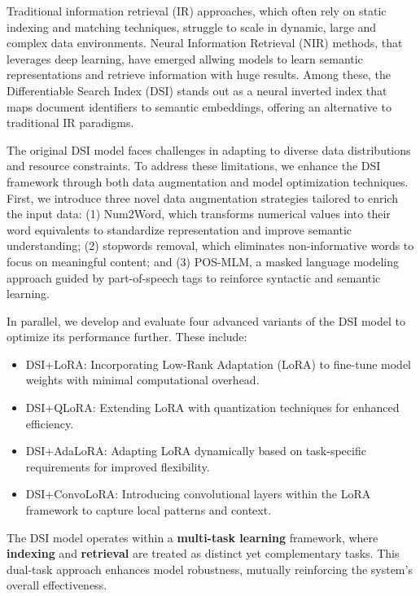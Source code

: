 Traditional information retrieval (IR) approaches, which often rely on static indexing and matching techniques, struggle to scale in dynamic, large and complex data environments. Neural Information Retrieval (NIR) methods, that leverages deep learning, have emerged allwing models to learn semantic representations and retrieve information with huge results. Among these, the Differentiable Search Index (DSI) stands out as a neural inverted index that maps document identifiers to semantic embeddings, offering an alternative to traditional IR paradigms.


The original DSI model faces challenges in adapting to diverse data distributions and resource constraints. To address these limitations, we enhance the DSI framework through both data augmentation and model optimization techniques. First, we introduce three novel data augmentation strategies tailored to enrich the input data: (1) Num2Word, which transforms numerical values into their word equivalents to standardize representation and improve semantic understanding; (2) stopwords removal, which eliminates non-informative words to focus on meaningful content; and (3) POS-MLM, a masked language modeling approach guided by part-of-speech tags to reinforce syntactic and semantic learning.

In parallel, we develop and evaluate four advanced variants of the DSI model to optimize its performance further. These include:
\begin{itemize}
    \item DSI+LoRA: Incorporating Low-Rank Adaptation (LoRA) to fine-tune model weights with minimal computational overhead.
    \item DSI+QLoRA: Extending LoRA with quantization techniques for enhanced efficiency.
    \item DSI+AdaLoRA: Adapting LoRA dynamically based on task-specific requirements for improved flexibility.
    \item DSI+ConvoLoRA: Introducing convolutional layers within the LoRA framework to capture local patterns and context.
\end{itemize}

The DSI model operates within a \textbf{multi-task learning} framework, where \textbf{indexing} and \textbf{retrieval} are treated as distinct yet complementary tasks. This dual-task approach enhances model robustness, mutually reinforcing the system's overall effectiveness.